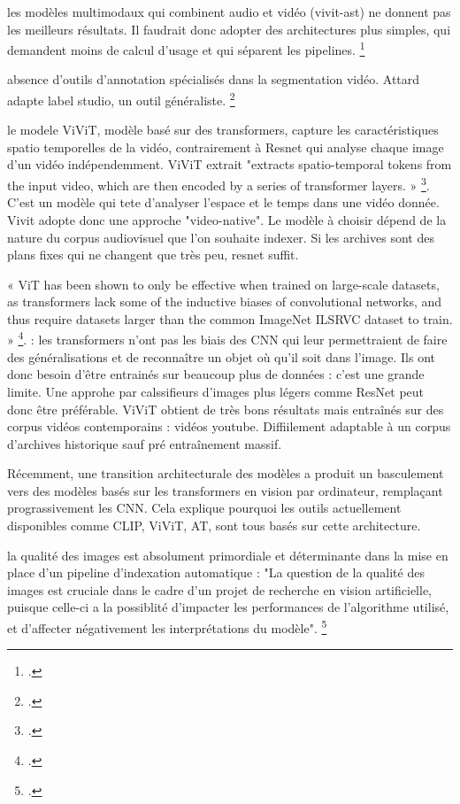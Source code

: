 \begin{itemize}
les modèles multimodaux qui combinent audio et vidéo (vivit-ast) ne donnent pas les meilleurs résultats. Il faudrait donc adopter des architectures plus simples, qui demandent moins de calcul d'usage et qui séparent les pipelines. \footcite{attard2025}

absence d'outils d'annotation spécialisés dans la segmentation vidéo. Attard adapte label studio, un outil généraliste. \footcite{attard2025}

le modele ViViT, modèle basé sur des transformers, capture les caractéristiques spatio temporelles de la vidéo, contrairement à Resnet qui analyse chaque image d'un vidéo indépendemment. ViViT extrait "extracts spatio-temporal tokens from the input video, which are then encoded by a series of transformer layers. » \footcite{arnab2021}. C'est un modèle qui tete d'analyser l'espace et le temps dans une vidéo donnée. Vivit adopte donc une approche "video-native". 
Le modèle à choisir dépend de la nature du corpus audiovisuel que l'on souhaite indexer. Si les archives sont des plans fixes qui ne changent que très peu, resnet suffit. 

« ViT has been shown to only be effective when trained on large-scale datasets, as transformers lack some of the inductive biases of convolutional networks, and thus require datasets larger than the common ImageNet ILSRVC dataset to train. » \footcite{arnab2021}. : les transformers n'ont pas les biais des CNN qui leur permettraient de faire des généralisations et de reconnaître un objet où qu'il soit dans l'image. Ils ont donc besoin d'être entrainés sur beaucoup plus de données : c'est une grande limite. Une approhe par calssifieurs d'images plus légers comme ResNet peut donc être préférable. ViViT obtient de très bons résultats mais entraînés sur des corpus vidéos contemporains : vidéos youtube. Diffiilement adaptable à un corpus d'archives historique sauf pré entraînement massif. 

Récemment, une transition architecturale des modèles a produit un basculement vers des modèles basés sur les transformers en vision par ordinateur, remplaçant prograssivement les CNN. Cela explique pourquoi les outils actuellement disponibles comme CLIP, ViViT, AT, sont tous basés sur cette architecture. 

la qualité des images est absolument primordiale et déterminante dans la mise en place d'un pipeline d'indexation automatique : "La question de la qualité des images est
cruciale dans le cadre d’un projet de recherche en vision artificielle, puisque celle-ci a la possiblité d’impacter les performances de l’algorithme utilisé, et d’affecter négativement les interprétations du modèle". \footcite{norindr2023}
	
\end{itemize}